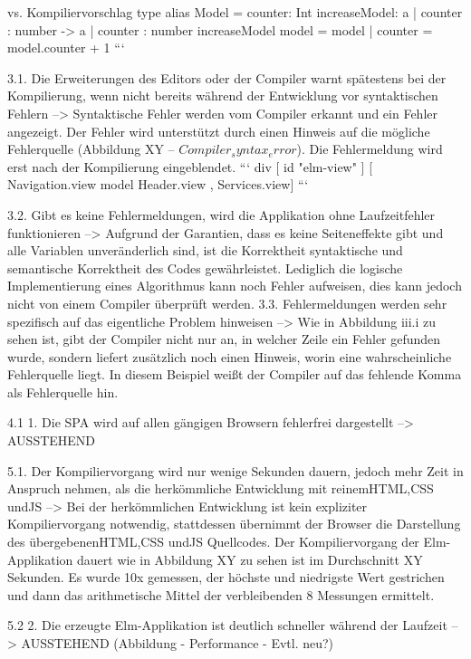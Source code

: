  vs. Kompiliervorschlag
 type alias Model = { counter: Int }
 increaseModel: { a | counter : number } -> { a | counter : number }
 increaseModel model =
     {model | counter = model.counter + 1}
 ```
 
 3.1. Die Erweiterungen des Editors oder der Compiler warnt spätestens bei der Kompilierung, wenn nicht bereits während der Entwicklung vor syntaktischen Fehlern
 --> Syntaktische Fehler werden vom Compiler erkannt und ein Fehler angezeigt. Der Fehler wird unterstützt durch einen Hinweis auf die mögliche Fehlerquelle (Abbildung XY – $Compiler_syntax_error$). Die Fehlermeldung wird erst nach der Kompilierung eingeblendet.
 ```
 div [ id "elm-view" ]
         [ Navigation.view model
             Header.view
         , Services.view]
 ```
 
 3.2. Gibt es keine Fehlermeldungen, wird die Applikation ohne Laufzeitfehler funktionieren
 --> Aufgrund der Garantien, dass es keine Seiteneffekte gibt und alle Variablen unveränderlich sind, ist die Korrektheit syntaktische und semantische Korrektheit des Codes gewährleistet. Lediglich die logische Implementierung eines Algorithmus kann noch Fehler aufweisen, dies kann jedoch nicht von einem Compiler überprüft werden.
 3.3. Fehlermeldungen werden sehr spezifisch auf das eigentliche Problem hinweisen
 --> Wie in Abbildung iii.i zu sehen ist, gibt der Compiler nicht nur an, in welcher Zeile ein Fehler gefunden wurde, sondern liefert zusätzlich noch einen Hinweis, worin eine wahrscheinliche Fehlerquelle liegt. In diesem Beispiel weißt der Compiler auf das fehlende Komma als Fehlerquelle hin.
 
 4.1  1. Die SPA wird auf allen gängigen Browsern fehlerfrei dargestellt
 --> AUSSTEHEND
 
 5.1. Der Kompiliervorgang wird nur wenige Sekunden dauern, jedoch mehr Zeit in Anspruch nehmen, als die herkömmliche Entwicklung mit reinem\ac{HTML},\ac{CSS} und\ac{JS}
 --> Bei der herkömmlichen Entwicklung ist kein expliziter Kompiliervorgang notwendig, stattdessen übernimmt der Browser die Darstellung des übergebenen\ac{HTML},\ac{CSS} und\ac{JS} Quellcodes. Der Kompiliervorgang der Elm-Applikation dauert wie in Abbildung XY  zu sehen ist im Durchschnitt XY Sekunden. Es wurde 10x gemessen, der höchste und niedrigste Wert gestrichen und dann das arithmetische Mittel der verbleibenden 8 Messungen ermittelt.
 
 5.2  2. Die erzeugte Elm-Applikation ist deutlich schneller während der Laufzeit
 --> AUSSTEHEND (Abbildung - Performance - Evtl. neu?)
 
